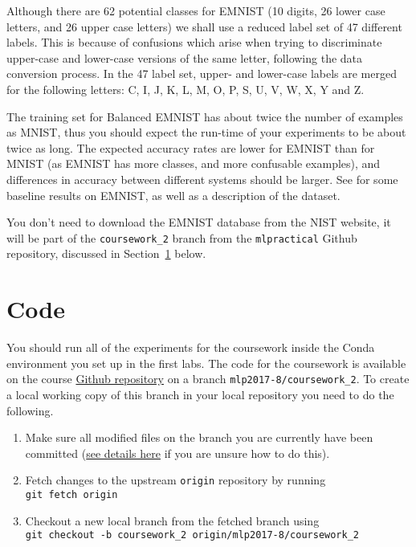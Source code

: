 \documentclass[11pt,]{article}
\begin{document}
Although there are 62 potential classes for EMNIST (10 digits, 26 lower case letters, and 26 upper case letters) we shall use a reduced label set of 47 different labels.  This is because of confusions which arise when trying to discriminate upper-case and lower-case versions of the same letter, following the data conversion process.  In the 47 label set, upper- and lower-case labels are merged for the following letters: C, I, J, K, L, M, O, P, S, U, V, W, X, Y and Z.  

The training set for Balanced EMNIST has about twice the number of examples as MNIST, thus you should expect the run-time of your experiments to be about twice as long.  The expected accuracy rates are lower for EMNIST than for MNIST (as EMNIST has more classes, and more confusable examples), and differences in accuracy between different systems should be larger.  See \citet{cohen2017emnist} for some baseline results on EMNIST, as well as a description of the dataset.

You don't need to download the EMNIST database from the NIST website, it will be part of the \verb+coursework_2+ branch from the \verb+mlpractical+ Github repository, discussed in Section~\ref{sec:code} below.




\section{Code}
\label{sec:code}

You should run all of the experiments for the coursework inside the
Conda environment you set up in the first labs.  The code for the coursework 
is available on the course
\href{https://github.com/CSTR-Edinburgh/mlpractical/}{Github repository}
on a branch \verb+mlp2017-8/coursework_2+. To create a local working
copy of this branch in your local repository you need to do the
following.

\begin{enumerate}
\def\labelenumi{\arabic{enumi}.}
\itemsep1pt\parskip0pt
\item
  Make sure all modified files on the branch you are currently have been
  committed
  (\href{https://github.com/CSTR-Edinburgh/mlpractical/blob/mlp2017-8/master/notes/getting-started-in-a-lab.md}{see
  details here} if you are unsure how to do this).
\item
  Fetch changes to the upstream \texttt{origin} repository by running\\
  \texttt{git fetch origin}
\item
  Checkout a new local branch from the fetched branch using\\
  \verb+git checkout -b coursework_2 origin/mlp2017-8/coursework_2+
\end{enumerate}
\end{document}
